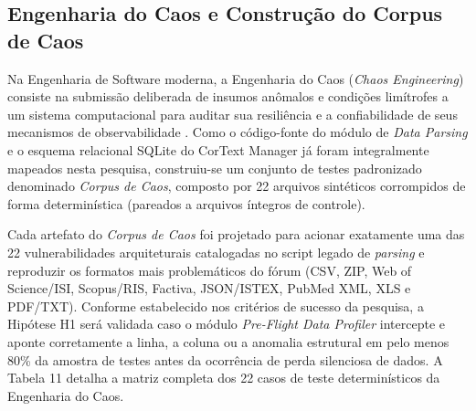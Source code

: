 \documentclass[
	oneside,
	a4paper,
	12pt,
	chapter=TITLE,
	section=TITLE,
	english,
	brazilian
]{abntex2}
\begin{document}
\FloatBarrier
\subsection{Engenharia do Caos e Construção do Corpus de Caos}\label{sec:engenharia_do_caos_e_construcao_do_corpu}


Na Engenharia de Software moderna, a Engenharia do Caos (\textit{Chaos Engineering}) consiste na submissão deliberada de insumos anômalos e condições limítrofes a um sistema computacional para auditar sua resiliência e a confiabilidade de seus mecanismos de observabilidade \cite{Majors2022}. Como o código-fonte do módulo de \textit{Data Parsing} e o esquema relacional SQLite do CorText Manager já foram integralmente mapeados nesta pesquisa, construiu-se um conjunto de testes padronizado denominado \textit{Corpus de Caos}, composto por 22 arquivos sintéticos corrompidos de forma determinística (pareados a arquivos íntegros de controle).

Cada artefato do \textit{Corpus de Caos} foi projetado para acionar exatamente uma das 22 vulnerabilidades arquiteturais catalogadas no script legado de \textit{parsing} e reproduzir os formatos mais problemáticos do fórum (CSV, ZIP, Web of Science/ISI, Scopus/RIS, Factiva, JSON/ISTEX, PubMed XML, XLS e PDF/TXT). Conforme estabelecido nos critérios de sucesso da pesquisa, a Hipótese H1 será validada caso o módulo \textit{Pre-Flight Data Profiler} intercepte e aponte corretamente a linha, a coluna ou a anomalia estrutural em pelo menos 80\% da amostra de testes antes da ocorrência de perda silenciosa de dados. A Tabela 11 detalha a matriz completa dos 22 casos de teste determinísticos da Engenharia do Caos.
\end{document}
